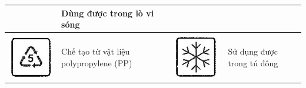 \documentclass[10pt]{article}
\begin{document}
\begin{center}
\begin{tabular}{|l|l|l|l|}
 & Dùng được trong lò vi sóng \\
\hline
\includegraphics[max width=\textwidth]{2025_10_23_3f52bbaab6caa9e2ff75g-08(2)}
 & Chế tạo từ vật liệu polypropylene (PP) & \includegraphics[max width=\textwidth]{2025_10_23_3f52bbaab6caa9e2ff75g-08(3)}
 & Sử dụng được trong tú đông \\
\hline
\end{tabular}
\end{center}
\end{document}
